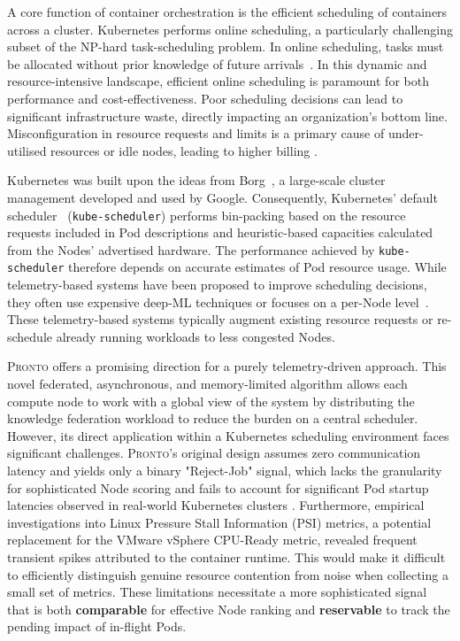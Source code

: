 A core function of container orchestration is the efficient scheduling of
containers across a cluster. Kubernetes performs online scheduling, a
particularly challenging subset of the NP-hard task-scheduling problem. In
online scheduling, tasks must be allocated without prior knowledge of future
arrivals~\cite{pruhs2004online}. In this dynamic and resource-intensive
landscape, efficient online scheduling is paramount for both performance and
cost-effectiveness. Poor scheduling decisions can lead to significant
infrastructure waste, directly impacting an organization's bottom line.
Misconfiguration in resource requests and limits is a primary cause of
under-utilised resources or idle nodes, leading to higher billing
\cite{cost-strategies,
bin-packing-and-cost-savings-in-kubernetes-clusters-on-aws}.

Kubernetes was built upon the ideas from Borg~\cite{}, a large-scale cluster
management developed and used by Google. Consequently, Kubernetes' default
scheduler~\cite{kube-scheduler} (\texttt{kube-scheduler}) performs bin-packing
based on the resource requests included in Pod descriptions and heuristic-based
capacities calculated from the Nodes' advertised hardware. The performance
achieved by \texttt{kube-scheduler} therefore depends on accurate estimates of
Pod resource usage. While telemetry-based systems have been proposed to improve
scheduling decisions, they often use expensive deep-ML techniques
\cite{bao2019deep, peng2021dl2} or focuses on a per-Node
level~\cite{yang2019design}. These telemetry-based systems typically augment
existing resource requests or re-schedule already running workloads to less
congested Nodes.

\textsc{Pronto} \cite{grammenos_pronto_2021} offers a promising direction for a
purely telemetry-driven approach. This novel federated, asynchronous, and
memory-limited algorithm allows each compute node to work with a
global view of the system by distributing the knowledge federation workload to
reduce the burden on a central scheduler. However, its direct application within
a Kubernetes scheduling
environment faces significant challenges. \textsc{Pronto}'s original design
assumes zero communication latency and yields only a binary "Reject-Job" signal,
which lacks the granularity for sophisticated Node scoring and fails to account
for significant Pod startup latencies observed in real-world Kubernetes clusters
\cite{qadeer_scaling_2022}. Furthermore, empirical investigations into Linux
Pressure Stall Information (PSI) metrics, a potential replacement for the VMware
vSphere CPU-Ready metric, revealed frequent transient spikes attributed to the
container runtime. This would make it difficult to efficiently distinguish
genuine resource contention from noise when collecting a small set of metrics.
These limitations necessitate a more sophisticated signal that is both
\textbf{comparable} for effective Node ranking and \textbf{reservable} to track
the pending impact of in-flight Pods.

